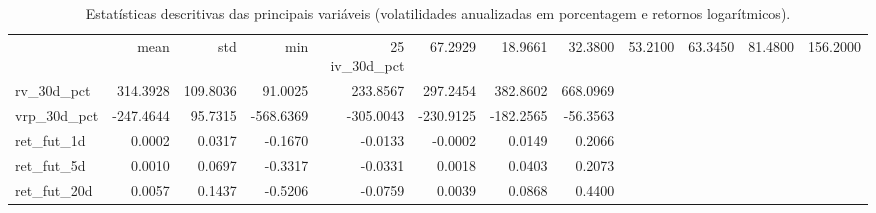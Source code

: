 \begin{table}
\caption{Estatísticas descritivas das principais variáveis (volatilidades anualizadas em porcentagem e retornos logarítmicos).}
\label{tab:estatisticas_principais}
\begin{tabular}{lrrrrrrr}
\toprule
 & mean & std & min & 25%
\midrule
iv_30d_pct & 67.2929 & 18.9661 & 32.3800 & 53.2100 & 63.3450 & 81.4800 & 156.2000 \\
rv_30d_pct & 314.3928 & 109.8036 & 91.0025 & 233.8567 & 297.2454 & 382.8602 & 668.0969 \\
vrp_30d_pct & -247.4644 & 95.7315 & -568.6369 & -305.0043 & -230.9125 & -182.2565 & -56.3563 \\
ret_fut_1d & 0.0002 & 0.0317 & -0.1670 & -0.0133 & -0.0002 & 0.0149 & 0.2066 \\
ret_fut_5d & 0.0010 & 0.0697 & -0.3317 & -0.0331 & 0.0018 & 0.0403 & 0.2073 \\
ret_fut_20d & 0.0057 & 0.1437 & -0.5206 & -0.0759 & 0.0039 & 0.0868 & 0.4400 \\
\bottomrule
\end{tabular}
\end{table}
